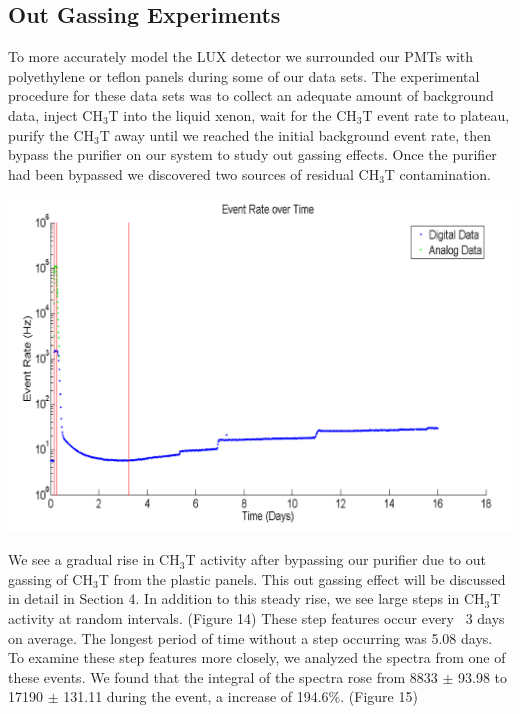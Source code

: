 \documentclass[a4paper,12pt]{article}
\begin{document}
\subsection{Out Gassing Experiments}

To more accurately model the LUX detector we surrounded our PMTs with polyethylene or teflon panels during some of our data sets.  The experimental procedure for these data sets was to collect an adequate amount of background data, inject CH$_3$T into the liquid xenon, wait for the CH$_3$T event rate to plateau, purify the CH$_3$T away until we reached the initial background event rate, then bypass the purifier on our system to study out gassing effects.  Once the purifier had been bypassed we discovered two sources of residual CH$_3$T contamination.  

\begin{center}
\includegraphics[scale=0.4]{Outgassing_TimeHisto_Log.png}
\end{center}

We see a gradual rise in CH$_3$T activity after bypassing our purifier due to out gassing of CH$_3$T from the plastic panels.  This out gassing effect will be discussed in detail in Section 4. In addition to this steady rise, we see large steps in CH$_3$T activity at random intervals. (Figure 14)  These step features occur every ~3 days on average.  The longest period of time without a step occurring was 5.08 days. To examine these step features more closely, we analyzed the spectra from one of these events.  We found that the integral of the spectra rose from 8833 $\pm$ 93.98 to 17190 $\pm$ 131.11 during the event, a increase of 194.6\%. (Figure 15)  
\end{document}
